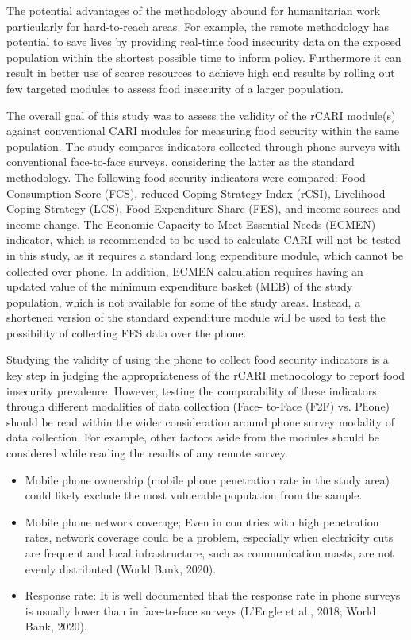 \documentclass[11pt,harvard]{article}
\begin{document}
The potential advantages of the methodology abound for humanitarian work particularly for hard-to-reach areas. For example, the remote methodology has potential to save lives by providing real-time food insecurity data on the exposed population within the shortest possible time to inform policy. Furthermore it can result in better use of scarce resources to achieve high end results by rolling out few targeted modules to assess food insecurity of a larger population.  	

The overall goal of this study was to assess the validity of the rCARI module(s) against conventional CARI modules for measuring food security within the same population. The study compares indicators collected through phone surveys with conventional face-to-face surveys, considering the latter as the standard methodology. The following food security indicators were compared: Food Consumption Score (FCS), reduced Coping Strategy Index (rCSI), Livelihood Coping Strategy (LCS), Food Expenditure Share (FES), and income sources and income change. The Economic Capacity to Meet Essential Needs (ECMEN) indicator, which is recommended to be used to calculate CARI will not be tested in this study, as it requires a standard long expenditure module, which cannot be collected over phone. In addition, ECMEN calculation requires having an updated value of the minimum expenditure basket (MEB) of the study population, which is not available for some of the study areas. Instead, a shortened version of the standard expenditure module will be used to test the possibility of collecting FES data over the phone.

Studying the validity of using the phone to collect food security indicators is a key step in judging the appropriateness of the rCARI methodology to report food insecurity prevalence. However, testing the comparability of these indicators through different modalities of data collection (Face- to-Face (F2F) vs. Phone) should be read within the wider consideration around phone survey modality of data collection. For example, other factors aside from the modules should be considered while reading the results of any remote survey.
	
	\begin{itemize}[label=--, left=1.5em]
		\item[1.]	Mobile phone ownership (mobile phone penetration rate in the study area) could likely exclude the most vulnerable population from the sample. 
		
		\item[2.]	Mobile phone network coverage; Even in countries with high penetration rates, network coverage could be a problem, especially when electricity cuts are frequent and local infrastructure, such as communication masts, are not evenly distributed (World Bank, 2020).
		
		\item[3.]	Response rate: It is well documented that the response rate in phone surveys is usually lower than in face-to-face surveys (L’Engle et al., 2018; World Bank, 2020). 
	\end{itemize}
	
\end{document}
